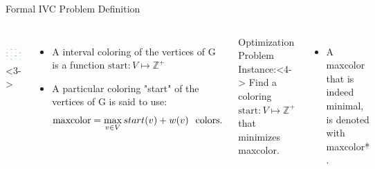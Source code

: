 \begin{frame}{Formal IVC Problem Definition}
  \begin{columns}
        \centering
         \\
        \null
        \includegraphics[width=1\textwidth]{figures/ICV1.pdf}<3->
    \begin{itemize}
      \item<1-> A interval coloring of the vertices of G is a function $\text{start} : V \mapsto \mathbb{Z^+}$
      \null
      \vfill
      \null
      \item<2-> A particular coloring "start" of the vertices of G is said to use:
      \[ \text{maxcolor}= \max_{v \in V} start(v) + w(v) \hspace{0.25cm}  \text{colors.}\]
    \end{itemize}
      \begin{block}{Optimization Problem Instance:}<4->
        Find a coloring $\text{start}:V \mapsto \mathbb{Z}^+$ that minimizes maxcolor. \\
      \end{block}
      \null
      \vfill
      \null
    \begin{itemize}
      \item<4-> A maxcolor that is indeed minimal, is denoted with maxcolor* .
    \end{itemize}

  \end{columns}
\end{frame}
  

